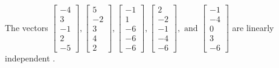 \begin{exercise}
\begin{exerciseStatement}
  \end{exerciseStatement}
  \begin{exerciseAnswer}
   The vectors \(\left[\begin{array}{r}
-4 \\
3 \\
-1 \\
2 \\
-5
\end{array}\right] , \left[\begin{array}{r}
5 \\
-2 \\
3 \\
4 \\
2
\end{array}\right] , \left[\begin{array}{r}
-1 \\
1 \\
-6 \\
-6 \\
-6
\end{array}\right] , \left[\begin{array}{r}
2 \\
-2 \\
-1 \\
-4 \\
-6
\end{array}\right] , \text{ and } \left[\begin{array}{r}
-1 \\
-4 \\
0 \\
3 \\
-6
\end{array}\right]\) are 
  	 linearly independent  .
  


  \end{exerciseAnswer}
\end{exercise}